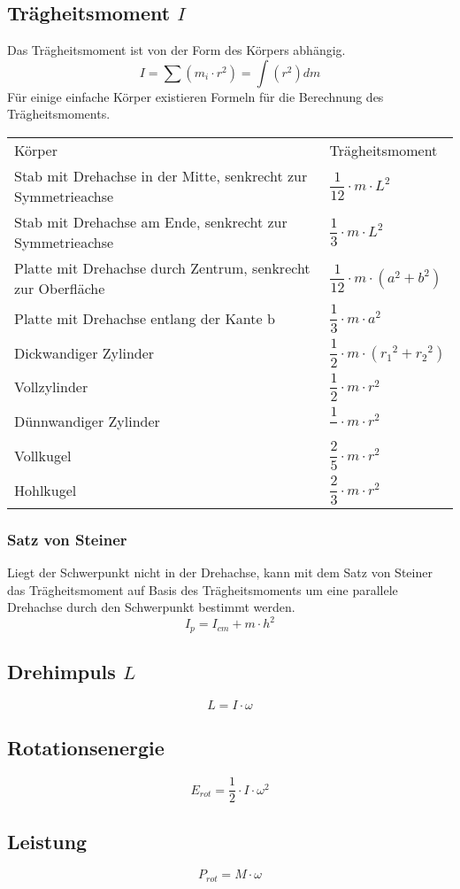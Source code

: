 \subsection{Trägheitsmoment $I$}
Das Trägheitsmoment ist von der Form des Körpers abhängig. 
\[ I = \sum (m_i \cdot r^2) = \int(r^2)dm\]
Für einige einfache Körper existieren Formeln für die Berechnung des 
Trägheitsmoments. 
\begin{table}[h!]
\begin{tabular}{p{}l}
\rowcolor{lgray}
Körper 
& Trägheitsmoment \\

\rowcolor{white}
Stab mit Drehachse in der Mitte, senkrecht zur Symmetrieachse 
& $\dfrac{1}{12} \cdot m \cdot L^2$ \\

\rowcolor{lgray}
Stab mit Drehachse am Ende, senkrecht zur Symmetrieachse 
& $\dfrac{1}{3} \cdot m \cdot L^2$ \\

\rowcolor{white}
Platte mit Drehachse durch Zentrum, senkrecht zur Oberfläche
& $\dfrac{1}{12} \cdot m \cdot (a^2 + b^2)$ \\

\rowcolor{lgray}
Platte mit Drehachse entlang der Kante b
& $\dfrac{1}{3} \cdot m \cdot a^2$ \\

\rowcolor{white}
Dickwandiger Zylinder
& $\dfrac{1}{2} \cdot m \cdot ({r_1}^2 + {r_2}^2)$ \\

\rowcolor{lgray}
Vollzylinder
& $\dfrac{1}{2} \cdot m \cdot r^2$ \\

\rowcolor{white}
Dünnwandiger Zylinder
& $\dfrac{1}{} \cdot m \cdot r^2$ \\

\rowcolor{lgray}
Vollkugel
& $\dfrac{2}{5} \cdot m \cdot r^2$ \\

\rowcolor{white}
Hohlkugel
& $\dfrac{2}{3} \cdot m \cdot r^2$ \\
\end{tabular}
\end{table}

\subsubsection{Satz von Steiner}
Liegt der Schwerpunkt nicht in der Drehachse, kann mit dem Satz von Steiner 
das Trägheitsmoment auf Basis des Trägheitsmoments um eine parallele Drehachse 
durch den Schwerpunkt bestimmt werden. 
\[ I_p = I_{cm} + m \cdot h^2 \]


\subsection{Drehimpuls $L$}
\[ L = I \cdot \omega \]

\subsection{Rotationsenergie}
\[ E_{rot} = \frac{1}{2} \cdot I \cdot \omega^2 \]

\subsection{Leistung}
\[ P_{rot} = M \cdot \omega \]

